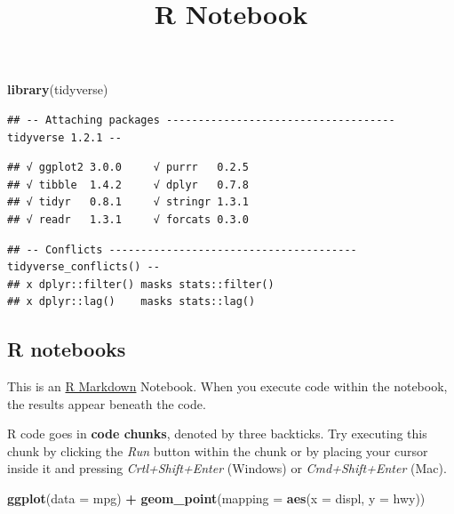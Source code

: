 \documentclass[]{article}
\title{R Notebook}
\author{}
\date{}
\newenvironment{Shaded}{\begin{snugshade}}{\end{snugshade}}
\newcommand{\KeywordTok}[1]{\textcolor[rgb]{0.13,0.29,0.53}{\textbf{#1}}}
\newcommand{\DataTypeTok}[1]{\textcolor[rgb]{0.13,0.29,0.53}{#1}}
\newcommand{\StringTok}[1]{\textcolor[rgb]{0.31,0.60,0.02}{#1}}
\newcommand{\OperatorTok}[1]{\textcolor[rgb]{0.81,0.36,0.00}{\textbf{#1}}}
\newcommand{\NormalTok}[1]{#1}
\begin{document}
\maketitle

\begin{Shaded}
\begin{Highlighting}[]
\KeywordTok{library}\NormalTok{(tidyverse)}
\end{Highlighting}
\end{Shaded}

\begin{verbatim}
## -- Attaching packages ------------------------------------ tidyverse 1.2.1 --
\end{verbatim}

\begin{verbatim}
## √ ggplot2 3.0.0     √ purrr   0.2.5
## √ tibble  1.4.2     √ dplyr   0.7.8
## √ tidyr   0.8.1     √ stringr 1.3.1
## √ readr   1.3.1     √ forcats 0.3.0
\end{verbatim}

\begin{verbatim}
## -- Conflicts --------------------------------------- tidyverse_conflicts() --
## x dplyr::filter() masks stats::filter()
## x dplyr::lag()    masks stats::lag()
\end{verbatim}

\subsection{R notebooks}\label{r-notebooks}

This is an \href{http://rmarkdown.rstudio.com}{R Markdown} Notebook.
When you execute code within the notebook, the results appear beneath
the code.

R code goes in \textbf{code chunks}, denoted by three backticks. Try
executing this chunk by clicking the \emph{Run} button within the chunk
or by placing your cursor inside it and pressing \emph{Crtl+Shift+Enter}
(Windows) or \emph{Cmd+Shift+Enter} (Mac).

\begin{Shaded}
\begin{Highlighting}[]
\KeywordTok{ggplot}\NormalTok{(}\DataTypeTok{data =}\NormalTok{ mpg) }\OperatorTok{+}
\StringTok{  }\KeywordTok{geom_point}\NormalTok{(}\DataTypeTok{mapping =} \KeywordTok{aes}\NormalTok{(}\DataTypeTok{x =}\NormalTok{ displ, }\DataTypeTok{y =}\NormalTok{ hwy))}
\end{Highlighting}
\end{Shaded}
\end{document}
